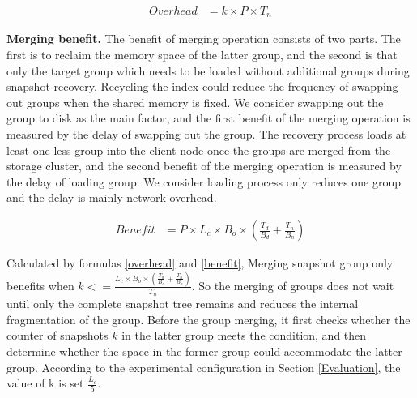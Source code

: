 \documentclass[sigconf, nonacm]{acmart}
\begin{document}
\vspace{-0.2cm}
\begin{small}
	\begin{equation}
		\label{overhead}
		\begin{split}
			Overhead&= k\times P \times T_n
		\end{split}
	\end{equation}	
\end{small}
\vspace{-0.2cm}

\textbf{Merging benefit.} The benefit of merging operation consists of two parts. The first is to reclaim the memory space of the latter group, and the second is that only the target group which needs to be loaded without additional groups during snapshot recovery. Recycling the index could reduce the frequency of swapping out groups when the shared memory is fixed. We consider swapping out the group to disk as the main factor, and the first benefit of the merging operation is measured by the delay of swapping out the group. 
The recovery process loads at least one less group into the client node once the groups are merged from the storage cluster, and the second benefit of the merging operation is measured by the delay of loading group. We consider loading process only reduces one group and the delay is mainly network overhead.

\vspace{-0.3cm}
\begin{small}
	\begin{equation}
		\label{benefit}
		\begin{split}
			Benefit&= P\times L_c \times B_o \times(\frac{T_d}{B_d} + \frac{T_n}{B_n})
		\end{split}
	\end{equation}
\end{small}
\vspace{-0.4cm}

Calculated by formulas \ref{overhead} and \ref{benefit}, Merging snapshot group only benefits when 
$k<=\frac{L_c\times B_o \times(\frac{T_d}{B_d} + \frac{T_n}{B_n})}{T_n}$. So the merging of groups does not wait until only the complete snapshot tree remains and reduces the internal fragmentation of the group. Before the group merging, it first checks whether the counter of snapshots $k$ in the latter group meets the condition, and then determine whether the space in the former group could accommodate the latter group. According to the experimental configuration in Section \ref{Evaluation}, the value of k is set $\frac{L_c}{5}$.
\end{document}

